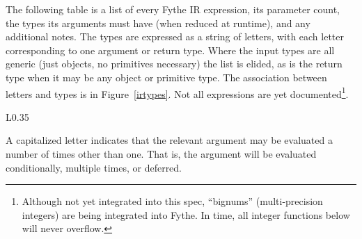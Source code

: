 The following table is a list of every Fythe IR expression, its parameter
count, the types its arguments must have (when reduced at runtime), and any
additional notes. The types are expressed as a string of letters, with each
letter corresponding to one argument or return type. Where the input types are
all generic (just objects, no primitives necessary) the list is elided, as is
the return type when it may be any object or primitive type. The association
between letters and types is in Figure~\ref{irtypes}. Not all expressions are
yet documented\footnote{Although not yet integrated into this spec, ``bignums''
(multi-precision integers) are being integrated into Fythe. In time, all
integer functions below will never overflow.}.


\begin{wrapfigure}{L}{0.35\textwidth}

A capitalized letter indicates that the relevant argument may be evaluated a
number of times other than one. That is, the argument will be evaluated
conditionally, multiple times, or deferred.

\caption{Fythe type identifiers}
\label{irtypes}
\end{wrapfigure}
